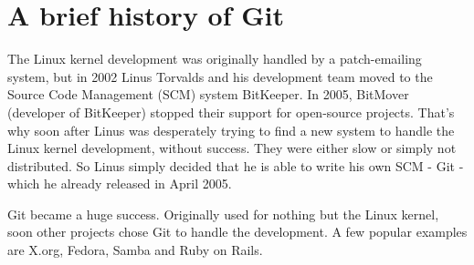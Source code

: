 \section {A brief history of Git}

The Linux kernel development was originally handled by a patch-emailing system, but in 2002 Linus Torvalds and his development team moved to the Source Code Management (SCM) system BitKeeper.
In 2005, BitMover (developer of BitKeeper) stopped their support for open-source projects. That's why soon after Linus was desperately trying to find a new system to handle the Linux kernel development, without success. They were either slow or simply not distributed. So Linus simply decided that he is able to write his own SCM - Git - which he already released in April 2005.

Git became a huge success. Originally used for nothing but the Linux kernel, soon other projects chose Git to handle the development. A few popular examples are X.org, Fedora, Samba and Ruby on Rails. \cite{gitinternals2008}